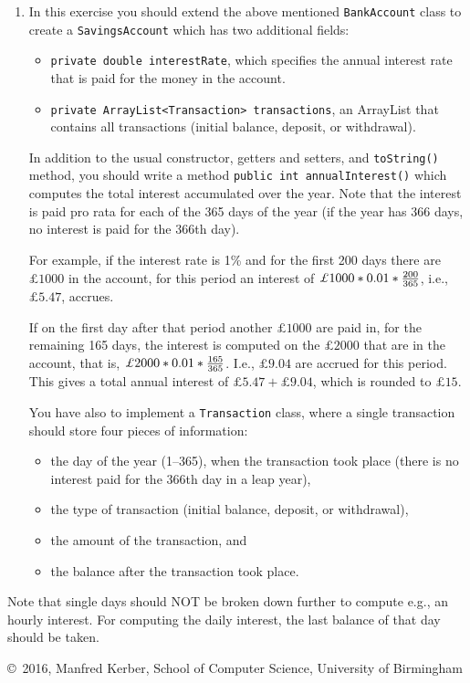 \documentclass[12pt]{article}
\def\myfooter{\vfill{\footnotesize\noindent\copyright\ 2016, Manfred Kerber, School of Computer Science, University of Birmingham}}
\begin{document}
\begin{enumerate}
\item In this exercise you should extend the above mentioned \texttt{BankAccount} class to create a \texttt{SavingsAccount} which has two additional fields:
\begin{itemize} 
\item \texttt{private double interestRate}, which specifies the annual interest rate that is paid for the money in the account.
\item \texttt{private ArrayList<Transaction> transactions}, an ArrayList that contains all transactions (initial balance, deposit, or withdrawal).
\end{itemize}

In addition to the usual constructor, getters and setters, and
\texttt{toString()} method, you should write a method \texttt{public
  int annualInterest()} which computes the total interest accumulated
over the year. Note that the interest is paid pro rata for each of the 365
days of the year (if the year has 366 days, no interest is paid for
the 366th day). 

For example, if the interest rate is 1\% and for the first 200 days
there are $\pounds 1000$ in the account, for this period an interest
of $\pounds 1000 * 0.01 * {200\over 365}$, i.e., $\pounds 5.47$,
accrues. 

If on the first day after that period another $\pounds 1000$ are
paid in, for the remaining 165 days, the interest is computed on the
$\pounds 2000$ that are in the account, that is, $\pounds 2000
* 0.01 * {165\over 365}$. I.e., $\pounds 9.04$ are accrued for this
period. This gives a total annual interest of $\pounds 5.47 + \pounds
9.04$, which is rounded to $\pounds 15$.

You have also to implement a \texttt{Transaction} class, where a single transaction should store four pieces of information:
\begin{itemize}
\item the day of the year (1--365), when the transaction took place (there is no interest paid for the 366th day in a leap year),
\item the type of transaction (initial balance, deposit, or withdrawal),
\item the amount of the transaction, and
\item the balance after the transaction took place.
\end{itemize}
\end{enumerate}
Note that single days should NOT be broken down further to compute
e.g., an hourly interest. For computing the daily interest, the last
balance of that day should be taken.

\myfooter
\end{document}

